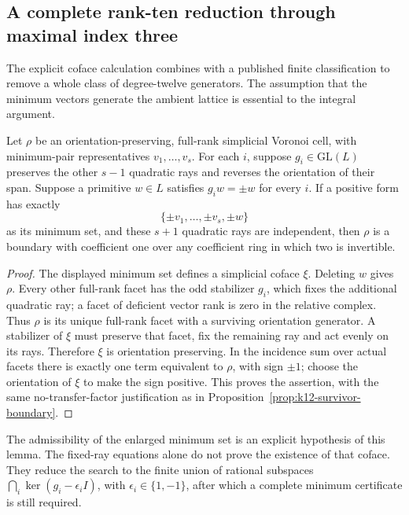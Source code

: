 \subsection{A complete rank-ten reduction through maximal index three}
\label{subsec:k12-trimodular-classification}

The explicit coface calculation combines with a published finite
classification to remove a whole class of degree-twelve generators.
The assumption that the minimum vectors generate the ambient lattice
is essential to the integral argument.

\begin{lemma}
\label{lem:k12-fixed-coface}
Let $\rho$ be an orientation-preserving, full-rank simplicial
Voronoi cell, with minimum-pair representatives $v_1,\ldots,v_s$.
For each $i$, suppose $g_i\in\mathrm{GL}(L)$ preserves the other
$s-1$ quadratic rays and reverses the orientation of their span.
Suppose a primitive $w\in L$ satisfies $g_iw=\pm w$ for every $i$.
If a positive form has exactly
\[
       \{\pm v_1,\ldots,\pm v_s,\pm w\}
\]
as its minimum set, and these $s+1$ quadratic rays are independent,
then $\rho$ is a boundary with coefficient one over any coefficient
ring in which two is invertible.
\end{lemma}

\begin{proof}
The displayed minimum set defines a simplicial coface $\xi$.
Deleting $w$ gives $\rho$. Every other full-rank facet has the
odd stabilizer $g_i$, which fixes the additional quadratic ray;
a facet of deficient vector rank is zero in the relative complex.
Thus $\rho$ is its unique full-rank facet with a surviving
orientation generator. A stabilizer of $\xi$ must preserve that
facet, fix the remaining ray and act evenly on its rays.
Therefore $\xi$ is orientation preserving. In the incidence
sum over actual facets there is exactly one term equivalent to
$\rho$, with sign $\pm1$; choose the orientation of $\xi$ to
make the sign positive. This proves the assertion, with the
same no-transfer-factor justification as in
Proposition~\ref{prop:k12-survivor-boundary}.
\end{proof}

The admissibility of the enlarged minimum set is an explicit
hypothesis of this lemma. The fixed-ray equations alone do not
prove the existence of that coface. They reduce the search to
the finite union of rational subspaces
$\bigcap_i\ker(g_i-\epsilon_i I)$, with $\epsilon_i\in\{1,-1\}$,
after which a complete minimum certificate is still required.

